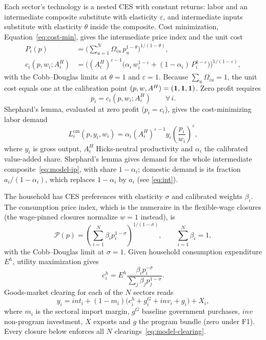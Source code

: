 

Each sector's technology is a nested CES with constant returns: labor and an intermediate composite substitute with elasticity $\varepsilon$, and intermediate inputs substitute with elasticity $\theta$ inside the composite. Cost minimization, Equation~\eqref{eq:cost-min}, gives the intermediate price index and the unit cost
\begin{align}
P_i(p) &= \Big(\textstyle\sum_{u=1}^N \Omega_{iu}\,p_u^{1-\theta}\Big)^{1/(1-\theta)},
\label{eq:model-ip}\\
c_i(p,w_i;A_i^{H}) &= \Big((A_i^{H})^{\varepsilon-1}\big(\alpha_i\,w_i^{1-\varepsilon}
  + (1-\alpha_i)\,P_i^{1-\varepsilon}\big)\Big)^{1/(1-\varepsilon)},
\label{eq:model-cost}
\end{align}
with the Cobb--Douglas limits at $\theta=1$ and $\varepsilon=1$. Because
$\sum_u\Omega_{iu}=1$, the unit cost equals one at the calibration point
$(p,w,A^{H})=(\mathbf{1},\mathbf{1},\mathbf{1})$. Zero profit requires
\begin{equation}
p_i = c_i(p,w_i;A_i^{H}) \qquad \forall\, i.
\label{eq:zp}
\end{equation}
Shephard's lemma, evaluated at zero profit ($p_i = c_i$), gives the
cost-minimizing labor demand
\begin{equation}
L_i^{\mathrm{cm}}(p,y_i,w_i)
 = \alpha_i (A_i^{H})^{\varepsilon-1} y_i
   \left(\frac{p_i}{w_i}\right)^{\varepsilon},
\label{eq:closure-labor-demand}
\end{equation}
where $y_i$ is gross output, $A_i^{H}$ Hicks-neutral productivity and $\alpha_i$ the calibrated
value-added share. Shephard's lemma gives demand for the whole intermediate
composite~\eqref{eq:model-ip}, with share $1-\alpha_i$; domestic demand is its
fraction $a_i/(1-\alpha_i)$, which replaces $1-\alpha_i$ by $a_i$
(see \eqref{eq:int}).

The household has CES preferences with elasticity $\sigma$ and calibrated
weights $\beta_i$. The consumption price index, which is the numeraire in the flexible-wage closures (the wage-pinned closures normalize $w=1$ instead), is
\begin{equation}
  \mathcal{P}(p) = \left(\sum_{i=1}^N \beta_i p_i^{1-\sigma}\right)^{1/(1-\sigma)},
  \qquad \sum_{i=1}^N \beta_i = 1,
  \label{eq:labor-cpi}
\end{equation}
with the Cobb--Douglas limit at $\sigma = 1$. Given household consumption
expenditure $E^h$, utility maximization gives
\begin{equation}
c_i^h = E^h\frac{\beta_i p_i^{-\sigma}}{\sum_j\beta_j p_j^{1-\sigma}}.
\label{eq:model-household}
\end{equation}
Goods-market clearing for each of the $N$ sectors reads
\begin{equation}
y_i = \mathit{int}_i + (1-m_i)\big(c_i^h + g_i^G + \mathit{inv}_i + g_i\big) + X_i,
\label{eq:model-clearing}
\end{equation}
where $m_i$ is the sectoral import margin, $g^G$ baseline government
purchases, $\mathit{inv}$ non-program investment, $X$ exports and $g$ the
program bundle (zero under F1). Every closure below enforces all $N$
clearings~\eqref{eq:model-clearing}.

